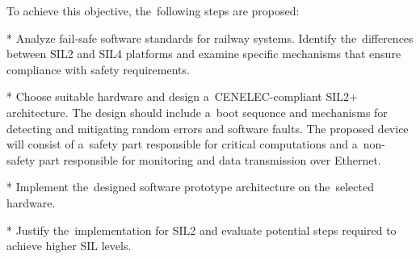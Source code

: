 To achieve this objective, the~following steps are proposed:

\begitems  
* Analyze fail-safe software standards for railway systems. Identify the~differences between SIL2 and SIL4 platforms and examine specific mechanisms that ensure compliance with safety requirements.

* Choose suitable hardware and design a~CENELEC-compliant SIL2+ architecture. The design should include a~boot sequence and mechanisms for detecting and mitigating random errors and software faults. The proposed device will consist of a~safety part responsible for critical computations and a~non-safety part responsible for monitoring and data transmission over Ethernet.

* Implement the~designed software prototype architecture on the~selected hardware.

* Justify the~implementation for SIL2 and evaluate potential steps required to achieve higher SIL levels.
\enditems